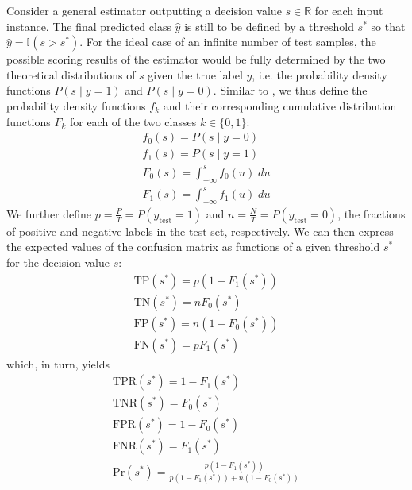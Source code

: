 Consider a general estimator outputting a decision value $s \in \mathbb{R}$ for each input instance. The final predicted class $\hat y$ is still to be defined by a threshold $s^*$ so that $\hat y = \mathbb{I}(s > s^*)$. For the ideal case of an infinite number of test samples, the possible scoring results of the estimator would be fully determined by the two theoretical distributions of $s$ given the true label $y$, i.e. the probability density functions $P(s \mid y = 1)$ and $P(s \mid y = 0)$. Similar to , we thus define the probability density functions $f_k$ and their corresponding cumulative distribution functions $F_k$ for each of the two classes $k \in \{0, 1\}$:
%
\begin{gather}
    f_0(s) = P(s \mid y = 0) \\
    f_1(s) = P(s \mid y = 1) \\
    F_0(s) = \int_{-\infty}^s f_0(u)\;du \\
    F_1(s) = \int_{-\infty}^s f_1(u)\;du
    \label{eq:ideal_confusion_matrix}
\end{gather}
%
We further define $p=\frac{P}{T}=P(y_\text{test}=1)$ and $n=\frac{N}{T}=P(y_\text{test}=0)$, the fractions of positive and negative labels in the test set, respectively. We can then express the expected values of the confusion matrix as functions of a given threshold $s^*$ for the decision value $s$:
%
\begin{gather}
    \text{TP}(s^*) = p (1 - F_1(s^*)) \\
    \text{TN}(s^*) = n F_0(s^*) \\
    \text{FP}(s^*) = n (1 - F_0(s^*)) \\
    \text{FN}(s^*) = p F_1(s^*)
\end{gather}
%
which, in turn, yields
%
\begin{gather}
    \text{TPR}(s^*) = 1 - F_1(s^*) \\
    \text{TNR}(s^*) = F_0(s^*) \\
    \text{FPR}(s^*) = 1 - F_0(s^*) \\
    \text{FNR}(s^*) = F_1(s^*) \\
    \text{Pr}(s^*) = \frac{p (1 - F_1(s^*))}{p (1 - F_1(s^*)) + n (1 - F_0(s^*))}
\end{gather}

